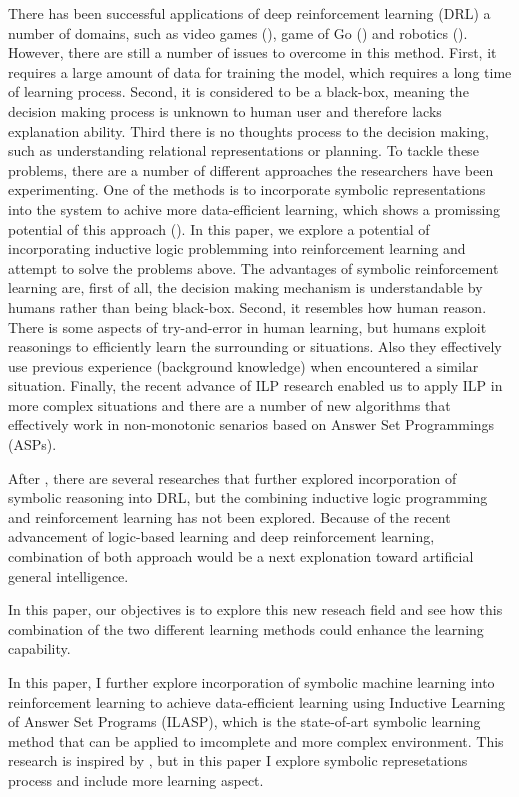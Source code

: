 \documentclass[12pt,twoside]{report}
\begin{document}
There has been successful applications of deep reinforcement learning (DRL) a number of domains, such as video games (\cite{Mnih2015}), game of Go (\cite{Silver2016}) and robotics (\cite{Levine2015}). However, there are still a number of issues to overcome in this method.
First, it requires a large amount of data for training the model, which requires a long time of learning process.
Second, it is considered to be a black-box, meaning the decision making process is unknown to human user and therefore lacks explanation ability. Third there is no thoughts process to the decision making, such as understanding relational representations or planning. 
To tackle these problems, there are a number of different approaches the researchers have been experimenting.
One of the methods is to incorporate symbolic representations into the system to achive more data-efficient learning, which shows a promissing potential of this approach (\cite{Garnelo2016}).
In this paper, we explore a potential of incorporating inductive logic problemming into reinforcement learning and attempt to solve the problems above.
The advantages of symbolic reinforcement learning are, first of all, the decision making mechanism is understandable by humans rather than being black-box.
Second, it resembles how human reason. There is some aspects of try-and-error in human learning, but humans exploit reasonings to efficiently learn the surrounding or situations. Also they effectively use previous experience (background knowledge) when encountered a similar situation.
Finally, the recent advance of ILP research enabled us to apply ILP in more complex situations and there are a number of new algorithms that effectively work in non-monotonic senarios based on Answer Set Programmings (ASPs).

After \cite{Garnelo2016},  there are several researches that further explored incorporation of symbolic reasoning into DRL, but the combining inductive logic programming and reinforcement learning has not been explored.
Because of the recent advancement of logic-based learning and deep reinforcement learning, combination of both approach would be a next explonation toward artificial general intelligence.

In this paper, our objectives is to explore this new reseach field and see how this combination of the two different learning methods could enhance the learning capability.

In this paper, I further explore incorporation of symbolic machine learning into reinforcement learning to achieve data-efficient learning using Inductive Learning of Answer Set Programs (ILASP), which is the state-of-art symbolic learning method that can be applied to imcomplete and more complex environment.
This research is inspired by \cite{Garnelo2016}, but in this paper I explore symbolic represetations process and include more learning aspect.
\end{document}
